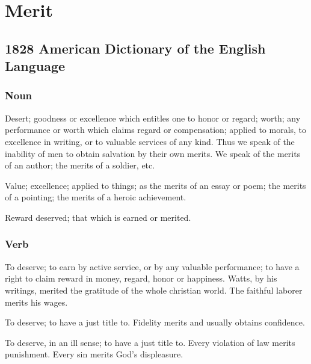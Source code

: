 \section{Merit}
	\label{MERIT}
	

\subsection{1828 American Dictionary of the English Language} %
	\label{MERIT-1828}
	
	\subsubsection{Noun}

		\begin{compactitem}
			\item[1] Desert; goodness or excellence which entitles one to honor or regard; worth; any performance or worth which claims regard or compensation; applied to morals, to excellence in writing, or to valuable services of any kind. Thus we speak of the inability of men to obtain salvation by their own merits. We speak of the merits of an author; the merits of a soldier, etc.
			\item[2] Value; excellence; applied to things; as the merits of an essay or poem; the merits of a pointing; the merits of a heroic achievement.
			\item[3] Reward deserved; that which is earned or merited.
		\end{compactitem}
		
	\subsubsection{Verb}
	
		\begin{compactitem}
			\item To deserve; to earn by active service, or by any valuable performance; to have a right to claim reward in money, regard, honor or happiness. Watts, by his writings, merited the gratitude of the whole christian world. The faithful laborer merits his wages.
			\item[1] To deserve; to have a just title to. Fidelity merits and usually obtains confidence.
			\item[2] To deserve, in an ill sense; to have a just title to. Every violation of law merits punishment. Every sin merits God's displeasure.
		\end{compactitem} 

